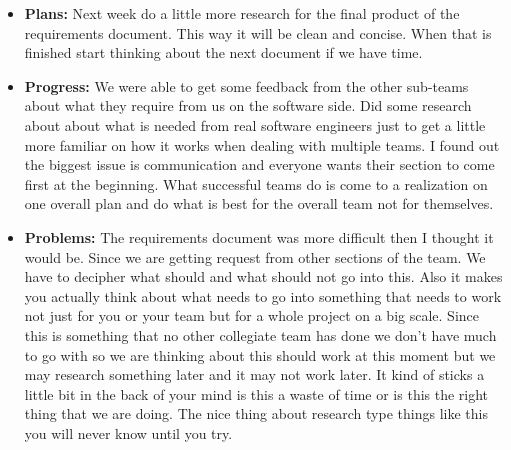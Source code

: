 \documentclass[10pt,draftclsnofoot,onecolumn]{IEEEtran}
\begin{document}
\begin{itemize}
	\item \textbf{Plans: }
	Next week do a little more research for the final product of the requirements document. This way it will be clean and concise. When that is finished start thinking about the next document if we have time.
	\item \textbf{Progress: }
	We were able to get some feedback from the other sub-teams about what they require from us on the software side. Did some research about about what is needed from real software engineers just to get a little more familiar on how it works when dealing with multiple teams. I found out the biggest issue is communication and everyone wants their section to come first at the beginning. What successful teams do is come to a realization on one overall plan and do what is best for the overall team not for themselves.
	\item \textbf{Problems: }
	The requirements document was more difficult then I thought it would be. Since we are getting request from other sections of the team. We have to decipher what should and what should not go into this. Also it makes you actually think about what needs to go into something that needs to work not just for you or your team but for a whole project on a big scale. Since this is something that no other collegiate team has done we don't have much to go with so we are thinking about this should work at this moment but we may research something later and it may not work later. It kind of sticks a little bit in the back of your mind is this a waste of time or is this the right thing that we are doing. The nice thing about research type things like this you will never know until you try.
\end{itemize}
\end{document}
